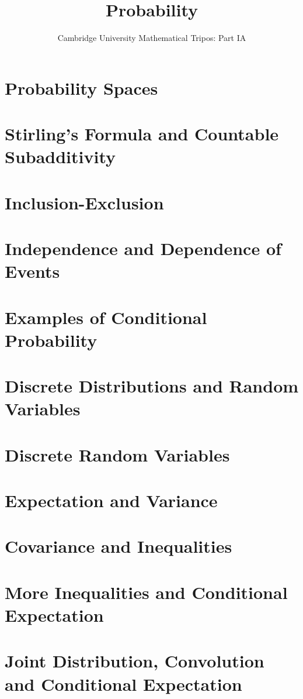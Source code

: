 \documentclass{article}
\title{Probability}
\author{Cambridge University Mathematical Tripos: Part IA}
\begin{document}
\maketitle

\tableofcontentsnewpage

\section{Probability Spaces}

\section{Stirling's Formula and Countable Subadditivity}

\section{Inclusion-Exclusion}

\section{Independence and Dependence of Events}

\section{Examples of Conditional Probability}

\section{Discrete Distributions and Random Variables}

\section{Discrete Random Variables}

\section{Expectation and Variance}

\section{Covariance and Inequalities}

\section{More Inequalities and Conditional Expectation}

\section{Joint Distribution, Convolution and Conditional Expectation}

\end{document}

